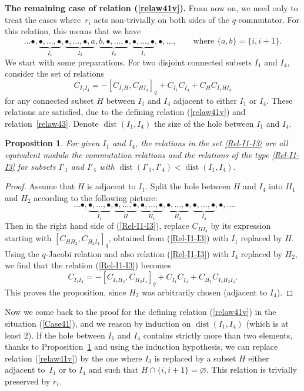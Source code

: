 \documentclass[pdftex]{sigma}
\numberwithin{equation}{section}
\newtheorem{prop}[theo]{Proposition}
\theoremstyle{definition}
\begin{document}
{\bf The remaining case of relation (\ref{relaw41v}).} From now on, we need only to treat the cases where~$r_i$ acts non-trivially on both sides of the $q$-commutator. For this relation, this means that we have
\begin{equation}\label{Case41} \ldots \bullet,\underbrace{\bullet,\dots,\bullet}_{I_1},\underbrace{\bullet,\dots,\bullet,a}_{I_2},\underbrace{b,\bullet,\dots,\bullet}_{I_3},\underbrace{\bullet,\dots,\bullet}_{I_4},\bullet,\ldots ,\qquad \text{where $\{a,b\}=\{i,i+1\}$.}\end{equation}
We start with some preparations. For two disjoint connected subsets $I_1$ and $I_4$, consider the set of relations
\begin{equation}\label{Rel-I1-I3}C_{I_1I_4}=-[C_{I_1H},C_{HI_4}]_q+C_{I_1}C_{I_4}+C_{H}C_{I_1HI_4}
\end{equation}
for any connected subset $H$ between $I_1$ and $I_4$ adjacent to either $I_1$ or $I_4$. These relations are satisfied, due to the defining relation (\ref{relaw41v}) and relation~\eqref{relaw43}. Denote $\operatorname{dist}(I_1,I_4)$ the size of the hole between $I_1$ and $I_4$.
\begin{prop}\label{prop-equiv}
For given $I_1$ and $I_4$, the relations in the set \eqref{Rel-I1-I3} are all equivalent modulo the commutation relations and the relations of the type \eqref{Rel-I1-I3} for subsets $I'_1$ and $I'_4$ with $\operatorname{dist}(I'_1,I'_4)<\operatorname{dist}(I_1,I_4)$.
\end{prop}
\begin{proof}
Assume that $H$ is adjacent to $I_1$. Split the hole between $H$ and $I_4$ into $H_1$ and $H_2$ according to the following picture:
\[\ \ \ldots \bullet,\underbrace{\bullet,\dots,\bullet}_{I_1},\underbrace{\bullet,\dots,\bullet}_{H},\underbrace{\bullet,\dots,\bullet}_{H_1},\underbrace{\bullet,\dots,\bullet}_{H_2},\underbrace{\bullet,\dots,\bullet}_{I_4},\bullet,\ldots .\]
Then in the right hand side of (\ref{Rel-I1-I3}), replace $C_{HI_4}$ by its expression starting with $[C_{HH_2},C_{H_2I_4}]_q$, obtained from (\ref{Rel-I1-I3}) with $I_1$ replaced by $H$. Using the $q$-Jacobi relation and also relation (\ref{Rel-I1-I3}) with $I_4$ replaced by $H_2$, we find that the relation (\ref{Rel-I1-I3}) becomes
\[C_{I_1I_4}=-[C_{I_1H_2},C_{H_2I_4}]_q+C_{I_1}C_{I_4}+C_{H_2}C_{I_1H_2I_4} .\]
This proves the proposition, since $H_2$ was arbitrarily chosen (adjacent to $I_4$).
\end{proof}

Now we come back to the proof for the defining relation (\ref{relaw41v}) in the situation (\ref{Case41}), and we reason by induction on $\operatorname{dist}(I_1,I_4)$ (which is at least 2). If the hole between $I_1$ and $I_4$ contains strictly more than two elements, thanks to Proposition~\ref{prop-equiv} and using the induction hypothesis, we can replace relation (\ref{relaw41v}) by the one where $I_3$ is replaced by a subset $H$ either adjacent to~$I_1$ or to $I_4$ and such that $H\cap\{i,i+1\}=\varnothing$. This relation is trivially preserved by $r_i$.
\end{document}
